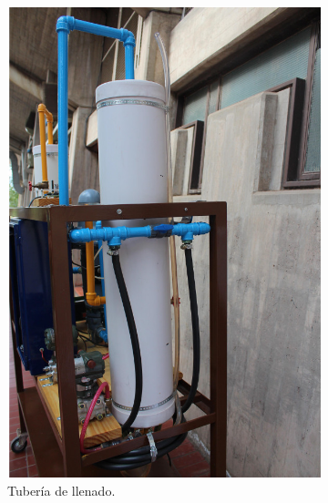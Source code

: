 \begin{figure}[t]
        \centering
        \begin{subfigure}[b]{0.40\textwidth}
\includegraphics[width=\textwidth]
	{Cap2-DisenoEnsamblado/images/caneria1.JPG}
	\caption{Tubería de llenado.}
        \end{subfigure}%
        \hfill
        \begin{subfigure}[b]{0.40\textwidth}

\end{subfigure}
\end{figure}
